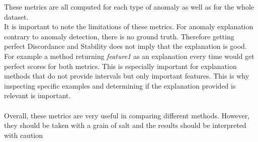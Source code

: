 \documentclass[oneside, a4paper, onecolumn, 11pt]{article}
\begin{document}
These metrics are all computed for each type of anomaly as well as for the whole dataset.\\
It is important to note the limitations of these metrics. For anomaly explanation contrary to anomaly detection, there is no ground truth. Therefore getting perfect Discordance and Stability does not imply that the explanation is good. For example a method returning \textit{feature1} as an explanation every time would get perfect scores for both metrics. This is especially important for explanation methods that do not provide intervals but only important features. This is why inspecting specific examples and determining if the explanation provided is relevant is important.\\\\
Overall, these metrics are very useful in comparing different methods. However, they should be taken with a grain of salt and the results should be interpreted with caution\\  
\end{document}
